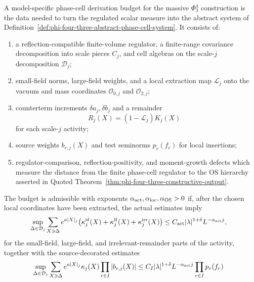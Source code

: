 \begin{definition}
\label{def:phi-four-three-model-phase-cell-budget}
A model-specific phase-cell derivation budget for the massive
\(\Phi^4_3\) construction is the data needed to turn the regulated scalar
measure into the abstract system of
Definition~\ref{def:phi-four-three-abstract-phase-cell-system}.  It consists
of:
\begin{enumerate}[label=(\roman*)]
\item a reflection-compatible finite-volume regulator, a finite-range
covariance decomposition into scale pieces \(C_j\), and cell algebras on
the scale-\(j\) decomposition \(\mathcal D_j\);
\item small-field norms, large-field weights, and a local extraction map
\(\mathcal L_j\) onto the vacuum and mass coordinates
\(\mathcal O_{0,j}\) and \(\mathcal O_{2,j}\);
\item counterterm increments \(\delta a_j,\delta b_j\) and a remainder
\[
  R_j(X)=(1-\mathcal L_j)K_j(X)
\]
for each scale-\(j\) activity;
\item source weights \(b_{r,j}(X)\) and test seminorms \(p_r(f_r)\) for
local insertions;
\item regulator-comparison, reflection-positivity, and moment-growth defects
which measure the distance from the finite phase-cell regulator to the OS
hierarchy asserted in Quoted
Theorem~\ref{thm:phi-four-three-constructive-output}.
\end{enumerate}
The budget is admissible with exponents
\(\alpha_{\rm act},\alpha_{\rm loc},\alpha_{\rm OS}>0\) if, after the
chosen local coordinates have been extracted, the actual estimates imply
\begin{equation}
  \sup_{\Delta\in\mathcal D_j}
  \sum_{X\ni\Delta}
  e^{a|X|_j}
  \bigl(\kappa_j^{\rm sf}(X)+\kappa_j^{\rm lf}(X)
        +\kappa_j^{\rm irr}(X)\bigr)
  \leq
  C_{\rm act}|\lambda|^{1+\delta}L^{-\alpha_{\rm act}j},
  \label{eq:phi-four-three-model-budget-activity-bound}
\end{equation}
for the small-field, large-field, and irrelevant-remainder parts of the
activity, together with the source-decorated estimates
\begin{equation}
  \sup_{\Delta\in\mathcal D_j}
  \sum_{X\ni\Delta}
  e^{a|X|_j}\kappa_j(X)
  \prod_{r\in I}|b_{r,j}(X)|
  \leq
  C_I|\lambda|^{1+\delta}L^{-\alpha_{\rm act}j}
  \prod_{r\in I}p_r(f_r)
  \label{eq:phi-four-three-model-budget-source-bound}
\end{equation}

\end{definition}
